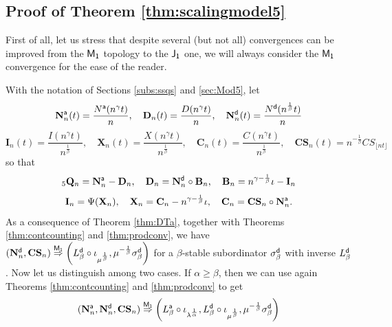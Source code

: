 \documentclass[]{amsart}
\numberwithin{equation}{section}
\theoremstyle{remark}
\theoremstyle{definition}
\begin{document}
\subsection{Proof of Theorem \ref{thm:scalingmodel5}}\label{sec:proof5}
	First of all, let us stress that despite several (but not all) convergences can be improved from the ${\sf M_1}$ topology to the ${\sf J_1}$ one, we will always consider the ${\sf M_1}$ convergence for the ease of the reader.
	
	With the notation of Sections \ref{subs:ssqs} and \ref{sec:Mod5}, let 
	\begin{equation*}
		\mathbf{N}^{\sf a}_n(t)=\frac{N^{\sf a}(n^\gamma t)}{n}, \quad \mathbf{D}_n(t)=\frac{D(n^\gamma t)}{n}, \quad \mathbf{N}^{\sf d}_n(t)=\frac{N^{\sf d}(n^{\frac{1}{\beta}} t)}{n} 
	\end{equation*}
	\begin{equation*}
		\mathbf{I}_n(t)=\frac{I(n^\gamma t)}{n^{\frac{1}{\beta}}}, \quad \mathbf{X}_n(t)=\frac{X(n^{\gamma }t)}{n^{\frac{1}{\beta}}}, \quad \mathbf{C}_n(t)=\frac{C(n^\gamma t)}{n^{\frac{1}{\beta}}}, \quad \mathbf{CS}_n(t)=n^{-\frac{1}{\beta}}CS_{\lfloor nt \rfloor} 
	\end{equation*}
	so that
	\begin{equation*}
		{}_5\mathbf{Q}_n=\mathbf{N}^{\sf a}_n-\mathbf{D}_n, \quad \mathbf{D}_n=\mathbf{N}^{\sf d}_n \circ \mathbf{B}_n, \quad \mathbf{B}_n=n^{\gamma-\frac{1}{\beta}}\iota-\mathbf{I}_n 
	\end{equation*}
	\begin{equation*}
		\mathbf{I}_n=\Psi(\mathbf{X}_n), \quad \mathbf{X}_n=\mathbf{C}_n-n^{\gamma-\frac{1}{\beta}}\iota, \quad \mathbf{C}_n=\mathbf{CS}_n \circ \mathbf{N}_n^{\sf a}.
	\end{equation*}
	As a consequence of Theorem \ref{thm:DTa}, together with Theorems \ref{thm:contcounting} and \ref{thm:prodconv}, we have $(\mathbf{N}^{\sf d}_n,\mathbf{ CS}_n) \overset{\sf M_1}{\Rightarrow} \left(L_\beta^{\sf d}\circ \iota_{\mu^{\frac{1}{\beta}}},\mu^{-\frac{1}{\beta}}\sigma_\beta^{\sf d}\right)$ for a $\beta$-stable subordinator $\sigma_\beta^{\sf d}$ with inverse $L_\beta^{\sf d}$. Now let us distinguish among two cases. If $\alpha \ge \beta$, then we can use again Theorems \ref{thm:contcounting} and \ref{thm:prodconv} to get 
	\begin{equation*}
		(\mathbf{N}^{\sf a}_n,\mathbf{N}^{\sf d}_n,\mathbf{ CS}_n) \overset{\sf M_1}{\Rightarrow} \left(L_\beta^{\sf a}\circ \iota_{\lambda^{\frac{1}{\alpha}}},L_\beta^{\sf d}\circ \iota_{\mu^{\frac{1}{\beta}}},\mu^{-\frac{1}{\beta}}\sigma_\beta^{\sf d}\right)
	\end{equation*}
\end{document}
